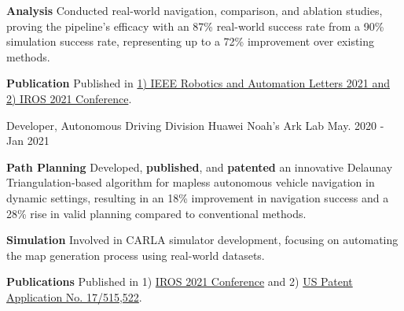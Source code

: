 \begin{cventries}
{\begin{cvitems}
{			}
			\item {
				\textbf{Analysis} Conducted real-world navigation, comparison, and ablation studies, proving the pipeline's efficacy with an 87\% real-world success rate from a 90\% simulation success rate, representing up to a 72\% improvement over existing methods.
			}
			\item {
				\textbf{Publication} Published in \href{https://ieeexplore.ieee.org/document/9468918}{1) IEEE Robotics and Automation Letters 2021 and 2) IROS 2021 Conference}.
			}
		\end{cvitems}
	}
	\cventry
	{Developer, Autonomous Driving Division}
	{Huawei Noah’s Ark Lab}
	{May. 2020 - Jan 2021}
	{}
	{
		\begin{cvitems}
			\item {
				\textbf{Path Planning} Developed, \textbf{published}, and \textbf{patented} an innovative Delaunay Triangulation-based algorithm for mapless autonomous vehicle navigation in dynamic settings, resulting in an 18\% improvement in navigation success and a 28\% rise in valid planning compared to conventional methods.
			}
			\item {
				\textbf{Simulation} Involved in CARLA simulator development, focusing on automating the map generation process using real-world datasets.
			}
			\item{
				\textbf{Publications} Published in 1) \href{https://ieeexplore.ieee.org/document/9636067}{IROS 2021 Conference} and 2) \href{https://patents.google.com/patent/US20220135068A1/en}{US Patent Application No. 17/515,522}.
			}
		\end{cvitems}
}
\end{cventries}
